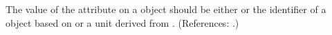 The value of the attribute  on a \Model object should be
either  or the identifier of a \UnitDefinition object
based on  or a unit derived from
.  (References: .)
